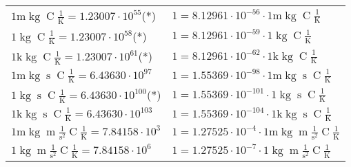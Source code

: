 \begin{center}
\begin{longtable}{l l}
{\color{gray}$1 \bm{\mathrm{ m}}\operatorname{kg}{}{}{\operatorname{C}}\frac1{\operatorname{K}} = 1.23007\cdot10^{55} $}\quad(*) & {\color{gray}$ 1 = 8.12961\cdot10^{-56} \cdot 1 \bm{\mathrm{ m}}\operatorname{kg}{}{}{\operatorname{C}}\frac1{\operatorname{K}}$}  \\
{\color{black}$1 \bm{\mathrm{ }}\operatorname{kg}{}{}{\operatorname{C}}\frac1{\operatorname{K}} = 1.23007\cdot10^{58} $}\quad(*) & {\color{black}$ 1 = 8.12961\cdot10^{-59} \cdot 1 \bm{\mathrm{ }}\operatorname{kg}{}{}{\operatorname{C}}\frac1{\operatorname{K}}$}  \\
{\color{gray}$1 \bm{\mathrm{ k}}\operatorname{kg}{}{}{\operatorname{C}}\frac1{\operatorname{K}} = 1.23007\cdot10^{61} $}\quad(*) & {\color{gray}$ 1 = 8.12961\cdot10^{-62} \cdot 1 \bm{\mathrm{ k}}\operatorname{kg}{}{}{\operatorname{C}}\frac1{\operatorname{K}}$}  \\
{\color{gray}$1 \bm{\mathrm{ m}}\operatorname{kg}{}{\operatorname{s}}{\operatorname{C}}\frac1{\operatorname{K}} = 6.43630\cdot10^{97} $}   & {\color{gray}$ 1 = 1.55369\cdot10^{-98} \cdot 1 \bm{\mathrm{ m}}\operatorname{kg}{}{\operatorname{s}}{\operatorname{C}}\frac1{\operatorname{K}}$}  \\
{\color{black}$1 \bm{\mathrm{ }}\operatorname{kg}{}{\operatorname{s}}{\operatorname{C}}\frac1{\operatorname{K}} = 6.43630\cdot10^{100} $}\quad(*) & {\color{black}$ 1 = 1.55369\cdot10^{-101} \cdot 1 \bm{\mathrm{ }}\operatorname{kg}{}{\operatorname{s}}{\operatorname{C}}\frac1{\operatorname{K}}$}  \\
{\color{gray}$1 \bm{\mathrm{ k}}\operatorname{kg}{}{\operatorname{s}}{\operatorname{C}}\frac1{\operatorname{K}} = 6.43630\cdot10^{103} $}   & {\color{gray}$ 1 = 1.55369\cdot10^{-104} \cdot 1 \bm{\mathrm{ k}}\operatorname{kg}{}{\operatorname{s}}{\operatorname{C}}\frac1{\operatorname{K}}$}  \\
{\color{gray}$1 \bm{\mathrm{ m}}\operatorname{kg}{\operatorname{m}}\frac1{\operatorname{s}^2}{\operatorname{C}}\frac1{\operatorname{K}} = 7.84158\cdot10^{3} $}   & {\color{gray}$ 1 = 1.27525\cdot10^{-4} \cdot 1 \bm{\mathrm{ m}}\operatorname{kg}{\operatorname{m}}\frac1{\operatorname{s}^2}{\operatorname{C}}\frac1{\operatorname{K}}$}  \\
{\color{black}$1 \bm{\mathrm{ }}\operatorname{kg}{\operatorname{m}}\frac1{\operatorname{s}^2}{\operatorname{C}}\frac1{\operatorname{K}} = 7.84158\cdot10^{6} $}   & {\color{black}$ 1 = 1.27525\cdot10^{-7} \cdot 1 \bm{\mathrm{ }}\operatorname{kg}{\operatorname{m}}\frac1{\operatorname{s}^2}{\operatorname{C}}\frac1{\operatorname{K}}$}  \\

\end{longtable}
\end{center}
